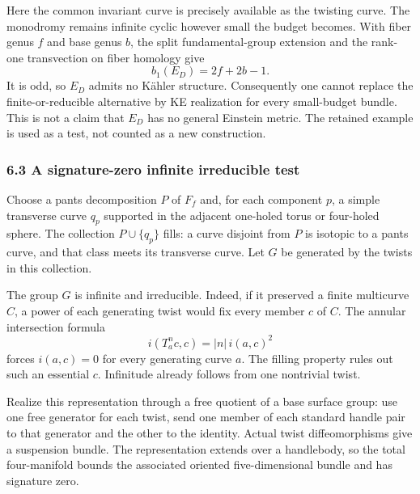 \documentclass[
  11pt,
]{article}
\begin{document}
Here the common invariant curve is precisely available as the twisting
curve. The monodromy remains infinite cyclic however small the budget
becomes. With fiber genus \(f\) and base genus \(b\), the split
fundamental-group extension and the rank-one transvection on fiber
homology give \[
                              b_1(E_D)=2f+2b-1.               \tag{28}
\] It is odd, so \(E_D\) admits no Kähler structure. Consequently one
cannot replace the finite-or-reducible alternative by KE realization for
every small-budget bundle. This is not a claim that \(E_D\) has no
general Einstein metric. The retained example is used as a test, not
counted as a new construction.

\hypertarget{a-signature-zero-infinite-irreducible-test}{%
\subsubsection{6.3 A signature-zero infinite irreducible
test}\label{a-signature-zero-infinite-irreducible-test}}

Choose a pants decomposition \(P\) of \(F_f\) and, for each component
\(p\), a simple transverse curve \(q_p\) supported in the adjacent
one-holed torus or four-holed sphere. The collection \(P\cup\{q_p\}\)
fills: a curve disjoint from \(P\) is isotopic to a pants curve, and
that class meets its transverse curve. Let \(G\) be generated by the
twists in this collection.

The group \(G\) is infinite and irreducible. Indeed, if it preserved a
finite multicurve \(C\), a power of each generating twist would fix
every member \(c\) of \(C\). The annular intersection formula \[
                    i(T_a^n c,c)=|n|\,i(a,c)^2               \tag{29}
\] forces \(i(a,c)=0\) for every generating curve \(a\). The filling
property rules out such an essential \(c\). Infinitude already follows
from one nontrivial twist.

Realize this representation through a free quotient of a base surface
group: use one free generator for each twist, send one member of each
standard handle pair to that generator and the other to the identity.
Actual twist diffeomorphisms give a suspension bundle. The
representation extends over a handlebody, so the total four-manifold
bounds the associated oriented five-dimensional bundle and has signature
zero.
\end{document}
